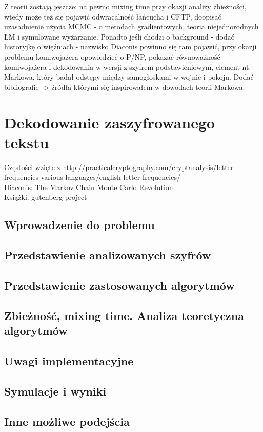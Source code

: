 \documentclass[a4paper]{article}
\begin{document}
 Z teorii zostają jeszcze: na pewno mixing time przy okazji analizy zbieżności, wtedy może też się pojawić odwracalność łańcucha i CFTP, doopisać uzasadnienie użycia MCMC - o metodach gradientowych, teoria niejednorodnych ŁM i symulowane wyżarzanie. Ponadto jeśli chodzi o background - dodać historyjkę o więźniach - nazwisko Diaconis powinno się tam pojawić, przy okazji problemu komiwojażera opowiedzieć o P/NP, pokazać równoważność komiwojażera i dekodowania w wersji z szyfrem podstawieniowym, element nt. Markowa, który badał odstępy między samogłoskami w wojnie i pokoju. Dodać bibliografię -> źródła którymi się inspirowałem w dowodach teorii Markowa.

\section{Dekodowanie zaszyfrowanego tekstu}
Częstości wzięte z http://practicalcryptography.com/cryptanalysis/letter-frequencies-various-languages/english-letter-frequencies/ \\
Diaconis: The Markov Chain Monte Carlo Revolution\\
Książki: gutenberg project
\subsection{Wprowadzenie do problemu}
\subsection{Przedstawienie analizowanych szyfrów}
\subsection{Przedstawienie zastosowanych algorytmów}
\subsection{Zbieżność, mixing time. Analiza teoretyczna algorytmów}
\subsection{Uwagi implementacyjne}
\subsection{Symulacje i wyniki}
\subsection{Inne możliwe podejścia}
\end{document}
